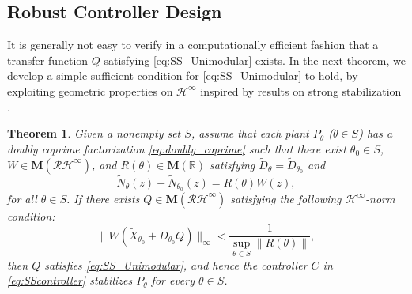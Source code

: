\documentclass[letterpaper, 12pt, draftcls, onecolumn]{ieeeconf}
\newtheorem{theorem}{Theorem}[section]
\begin{document}
\subsection{Robust Controller Design}
It is generally not easy to verify 
in a computationally efficient fashion
that
a transfer function $Q$ satisfying 
\eqref{eq:SS_Unimodular} exists.
In the next theorem, we develop a simple sufficient condition for
\eqref{eq:SS_Unimodular} to hold, by exploiting geometric properties
on $\mathcal{H}^{\infty}$ inspired by results
on strong stabilization \cite{zeren2000}.
\begin{theorem}
	\label{thm:suff}
	{\it
		Given a nonempty set $S$, 
		assume that each plant $P_{\theta}$ ($\theta \in S$)
		has a doubly coprime factorization \eqref{eq:doubly_coprime} 
		such that 
		there exist $\theta_0 \in S$, 
		$W \in \mathbf{M}(\mathcal{RH}^{\infty})$,
		and $R(\theta) \in \mathbf{M}(\mathbb{R})$ satisfying 
		$\tilde D_{\theta} = \tilde D_{\theta_0}$ and
		\begin{equation}
		\label{eq:N_cond}
		\tilde N_{\theta}(z) - \tilde N_{\theta_0}(z) = R(\theta) W(z),
		\end{equation}
		for all $\theta \in S$.
If there exists $Q\in \mathbf{M}(\mathcal{RH}^{\infty})$ 
		satisfying
		the following $\mathcal{H}^{\infty}$-norm condition:
		\begin{equation}
		\label{eq:Nehari_problem}
		\|W (\tilde X_{\theta_0} + D_{\theta_0} Q)\|_{\infty} < 
		\frac{1}{\sup_{\theta \in S}\|R(\theta)\|},
		\end{equation}
		then $Q$ satisfies \eqref{eq:SS_Unimodular}, and hence
		the controller $C$ in \eqref{eq:SScontroller} stabilizes 
		$P_{\theta}$ for every $\theta \in S$.
	}
\end{theorem}
\end{document}
